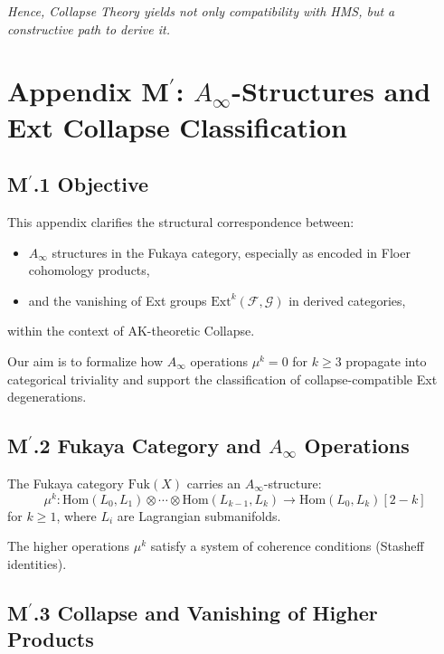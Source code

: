\documentclass[11pt]{article}
\begin{document}
\begin{axiom}
\begin{axiom}
{{\textit{Hence, Collapse Theory yields not only compatibility with HMS, but a constructive path to derive it.}


\section*{Appendix M$^\prime$: $A_\infty$-Structures and Ext Collapse Classification}

\subsection*{M$^\prime$.1 Objective}

This appendix clarifies the structural correspondence between:
\begin{itemize}
  \item \( A_\infty \) structures in the Fukaya category, especially as encoded in Floer cohomology products,
  \item and the vanishing of Ext groups \( \mathrm{Ext}^k(\mathcal{F}, \mathcal{G}) \) in derived categories,
\end{itemize}
within the context of AK-theoretic Collapse.

Our aim is to formalize how \( A_\infty \) operations \(\mu^k = 0\) for \(k \geq 3\) propagate into categorical triviality and support the classification of collapse-compatible Ext degenerations.

\subsection*{M$^\prime$.2 Fukaya Category and $A_\infty$ Operations}

The Fukaya category \( \mathrm{Fuk}(X) \) carries an \( A_\infty \)-structure:
\[
\mu^k : \mathrm{Hom}(L_0, L_1) \otimes \cdots \otimes \mathrm{Hom}(L_{k-1}, L_k) \to \mathrm{Hom}(L_0, L_k)[2 - k]
\]
for \( k \geq 1 \), where \( L_i \) are Lagrangian submanifolds.

The higher operations \( \mu^k \) satisfy a system of coherence conditions (Stasheff identities).

\subsection*{M$^\prime$.3 Collapse and Vanishing of Higher Products}

}}
\end{axiom}
\end{axiom}
\end{document}
